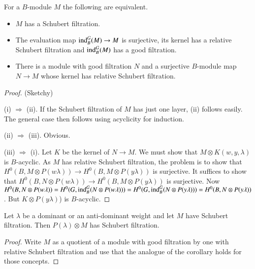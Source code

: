 \begin{proposition}\label{chap6-prop6.3.6}
For a $B$-module $M$ the following are equivalent.
\begin{itemize}
\item[\rm(i)] $M$ has a Schubert filtration.

\item[\rm(ii)] The evaluation map $\operatorname{ind}^{G}_{B}(M)\to M$ is
  surjective, its kernel has a relative Schubert filtration and
  $\operatorname{ind}^{G}_{B}(M)$ has a good filtration.

\item[\rm(iii)] There is a module with good filtration $N$ and a
  surjective $B$-modu\-le map $N\to M$ whose kernel has relative
  Schubert filtration.
\end{itemize}
\end{proposition}

\begin{proof}
(Sketchy)

(i) $\Rightarrow$ (ii). If the Schubert filtration of $M$ has just one
  layer, (ii) follows easily. The general case then follows using
  acyclicity for induction.

(ii) $\Rightarrow$ (iii). Obvious.

(iii) $\Rightarrow$ (i). Let $K$ be the kernel of $N\to M$. We must
  show that $M\otimes K(w,y,\lambda)$ is $B$-acyclic. As $M$ has
  relative Schubert filtration, the problem is to show that
  $H^{0}(B,M\otimes P(w\lambda))\to H^{0}(B,M\otimes P(y\lambda))$ is
  surjective. It suffices to show that $H^{0}(B,N\otimes
  P(w\lambda))\to H^{0}(B,M\otimes P(y\lambda))$ is surjective. Now
  $H^{0}(B,N\otimes P(w\lambda))=H^{0}(G,\operatorname{ind}^{G}_{B}(N\otimes
  P(w\lambda)))=H^{0}(G,\operatorname{ind}^{G}_{B}(N\otimes
  P(y\lambda)))=H^{0}(B,N\otimes P(y\lambda))$. But $K\otimes
  P(y\lambda)$) is $B$-acyclic.
\end{proof}

\begin{corollary}\label{chap6-coro6.3.7}
Let $\lambda$ be a dominant or an anti-dominant weight and let $M$
have Schubert filtration. Then $P(\lambda)\otimes M$ has Schubert
filtration. 
\end{corollary}

\begin{proof}
Write $M$ as a quotient of a module with good filtration by one with
relative Schubert filtration and use that the analogue of the
corollary holds for those concepts.
\end{proof}

